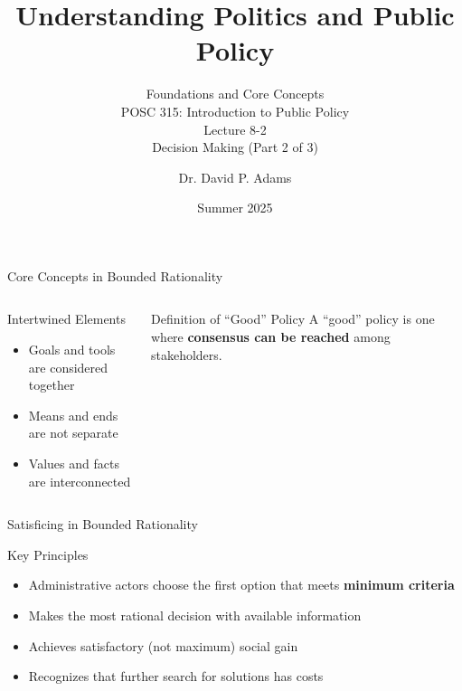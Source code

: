 \documentclass[10pt]{beamer}
\begin{document}
\title{Understanding Politics and Public Policy}
\subtitle{Foundations and Core Concepts\\POSC 315: Introduction to Public Policy\\Lecture 8-2\\Decision Making (Part 2 of 3)}
\author{Dr. David P. Adams}
\date{Summer 2025}

\maketitle


\begin{frame}{Core Concepts in Bounded Rationality}
\begin{columns}
\begin{column}{0.5\textwidth}
\begin{block}{Intertwined Elements}
\begin{itemize}
\item Goals and tools are considered together
\item Means and ends are not separate
\item Values and facts are interconnected
\end{itemize}
\end{block}
\end{column}
\begin{column}{0.5\textwidth}
\begin{block}{Definition of ``Good'' Policy}
A ``good'' policy is one where \textcolor{titanorange}{\textbf{consensus can be reached}} among stakeholders.
\end{block}
\end{column}
\end{columns}
\end{frame}

\begin{frame}{Satisficing in Bounded Rationality}
\begin{block}{Key Principles}
\begin{itemize}
\item Administrative actors choose the first option that meets \textcolor{titanorange}{\textbf{minimum criteria}}
\item Makes the most rational decision with available information
\item Achieves satisfactory (not maximum) social gain
\item Recognizes that further search for solutions has costs
\end{itemize}
\end{block}
\end{frame}
\end{document}

